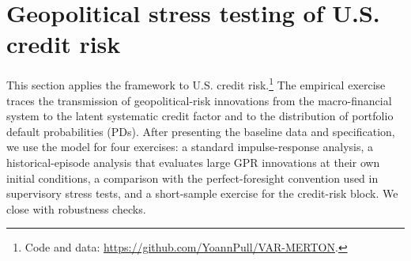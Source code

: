 \section{Geopolitical stress testing of U.S. credit risk}
\label{sec:empirical_analysis}
This section applies the framework to U.S. credit risk.\footnote{Code and data:
\url{https://github.com/YoannPull/VAR-MERTON}.} The empirical exercise traces
the transmission of geopolitical-risk innovations from the macro-financial
system to the latent systematic credit factor and to the distribution of
portfolio default probabilities (PDs). After presenting the baseline data and
specification, we use the model for four exercises: a standard impulse-response
analysis, a historical-episode analysis that evaluates large GPR innovations at
their own initial conditions, a comparison with the perfect-foresight
convention used in supervisory stress tests, and a short-sample exercise for
the credit-risk block. We close with robustness checks.
